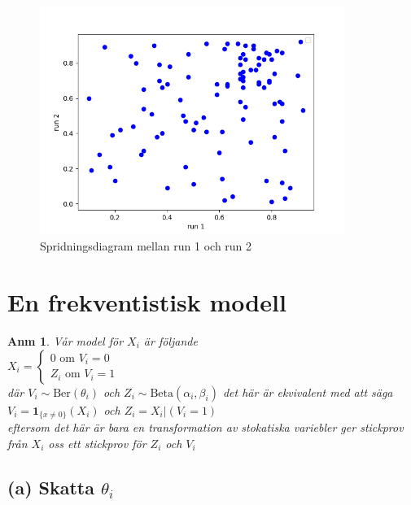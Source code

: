\documentclass{assignment}
\newcommand{\indicator}[1]{\mathbf{1}_{\{#1\}}}
\newtheorem{anm}{Anm}
\begin{document}
\begin{figure}
    \caption{Spridningsdiagram mellan run 1 och run 2}
    \begin{center}
        \includegraphics[width = 99mm]{assets/Figure_1.png}
    \end{center}
    \label{Spridningsdiagram}
\end{figure}


\section{En frekventistisk modell}
\begin{anm} \label{properties}
    Vår model för $X_i$ är följande 
    \\ $X_i = \left\{\begin{matrix}
        0 \text{ om } V_i=0
        \\ Z_i \text{ om } V_i=1
    \end{matrix}\right.$
    \\ där $V_i \sim \text{Ber}(\theta_i)$ och $Z_i\sim \text{Beta}(\alpha_i,\beta_i)$ det här är ekvivalent med att säga
    \\ $V_i = \indicator{x\neq0}(X_i)$ och $Z_i= X_i|(V_i=1)$ 
    \\ eftersom det här är bara en transformation av stokatiska variebler ger stickprov från $X_i$ oss ett stickprov för $Z_i$ och $V_i$
\end{anm}

\subsection*{(a) Skatta $\theta_{i}$}
\end{document}
